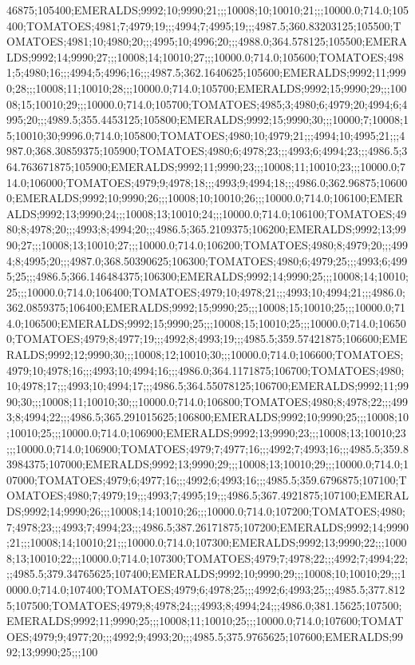 46875;105400;EMERALDS;9992;10;9990;21;;;10008;10;10010;21;;;10000.0;714.0;105400;TOMATOES;4981;7;4979;19;;;4994;7;4995;19;;;4987.5;360.83203125;105500;TOMATOES;4981;10;4980;20;;;4995;10;4996;20;;;4988.0;364.578125;105500;EMERALDS;9992;14;9990;27;;;10008;14;10010;27;;;10000.0;714.0;105600;TOMATOES;4981;5;4980;16;;;4994;5;4996;16;;;4987.5;362.1640625;105600;EMERALDS;9992;11;9990;28;;;10008;11;10010;28;;;10000.0;714.0;105700;EMERALDS;9992;15;9990;29;;;10008;15;10010;29;;;10000.0;714.0;105700;TOMATOES;4985;3;4980;6;4979;20;4994;6;4995;20;;;4989.5;355.4453125;105800;EMERALDS;9992;15;9990;30;;;10000;7;10008;15;10010;30;9996.0;714.0;105800;TOMATOES;4980;10;4979;21;;;4994;10;4995;21;;;4987.0;368.30859375;105900;TOMATOES;4980;6;4978;23;;;4993;6;4994;23;;;4986.5;364.763671875;105900;EMERALDS;9992;11;9990;23;;;10008;11;10010;23;;;10000.0;714.0;106000;TOMATOES;4979;9;4978;18;;;4993;9;4994;18;;;4986.0;362.96875;106000;EMERALDS;9992;10;9990;26;;;10008;10;10010;26;;;10000.0;714.0;106100;EMERALDS;9992;13;9990;24;;;10008;13;10010;24;;;10000.0;714.0;106100;TOMATOES;4980;8;4978;20;;;4993;8;4994;20;;;4986.5;365.2109375;106200;EMERALDS;9992;13;9990;27;;;10008;13;10010;27;;;10000.0;714.0;106200;TOMATOES;4980;8;4979;20;;;4994;8;4995;20;;;4987.0;368.50390625;106300;TOMATOES;4980;6;4979;25;;;4993;6;4995;25;;;4986.5;366.146484375;106300;EMERALDS;9992;14;9990;25;;;10008;14;10010;25;;;10000.0;714.0;106400;TOMATOES;4979;10;4978;21;;;4993;10;4994;21;;;4986.0;362.0859375;106400;EMERALDS;9992;15;9990;25;;;10008;15;10010;25;;;10000.0;714.0;106500;EMERALDS;9992;15;9990;25;;;10008;15;10010;25;;;10000.0;714.0;106500;TOMATOES;4979;8;4977;19;;;4992;8;4993;19;;;4985.5;359.57421875;106600;EMERALDS;9992;12;9990;30;;;10008;12;10010;30;;;10000.0;714.0;106600;TOMATOES;4979;10;4978;16;;;4993;10;4994;16;;;4986.0;364.1171875;106700;TOMATOES;4980;10;4978;17;;;4993;10;4994;17;;;4986.5;364.55078125;106700;EMERALDS;9992;11;9990;30;;;10008;11;10010;30;;;10000.0;714.0;106800;TOMATOES;4980;8;4978;22;;;4993;8;4994;22;;;4986.5;365.291015625;106800;EMERALDS;9992;10;9990;25;;;10008;10;10010;25;;;10000.0;714.0;106900;EMERALDS;9992;13;9990;23;;;10008;13;10010;23;;;10000.0;714.0;106900;TOMATOES;4979;7;4977;16;;;4992;7;4993;16;;;4985.5;359.83984375;107000;EMERALDS;9992;13;9990;29;;;10008;13;10010;29;;;10000.0;714.0;107000;TOMATOES;4979;6;4977;16;;;4992;6;4993;16;;;4985.5;359.6796875;107100;TOMATOES;4980;7;4979;19;;;4993;7;4995;19;;;4986.5;367.4921875;107100;EMERALDS;9992;14;9990;26;;;10008;14;10010;26;;;10000.0;714.0;107200;TOMATOES;4980;7;4978;23;;;4993;7;4994;23;;;4986.5;387.26171875;107200;EMERALDS;9992;14;9990;21;;;10008;14;10010;21;;;10000.0;714.0;107300;EMERALDS;9992;13;9990;22;;;10008;13;10010;22;;;10000.0;714.0;107300;TOMATOES;4979;7;4978;22;;;4992;7;4994;22;;;4985.5;379.34765625;107400;EMERALDS;9992;10;9990;29;;;10008;10;10010;29;;;10000.0;714.0;107400;TOMATOES;4979;6;4978;25;;;4992;6;4993;25;;;4985.5;377.8125;107500;TOMATOES;4979;8;4978;24;;;4993;8;4994;24;;;4986.0;381.15625;107500;EMERALDS;9992;11;9990;25;;;10008;11;10010;25;;;10000.0;714.0;107600;TOMATOES;4979;9;4977;20;;;4992;9;4993;20;;;4985.5;375.9765625;107600;EMERALDS;9992;13;9990;25;;;100